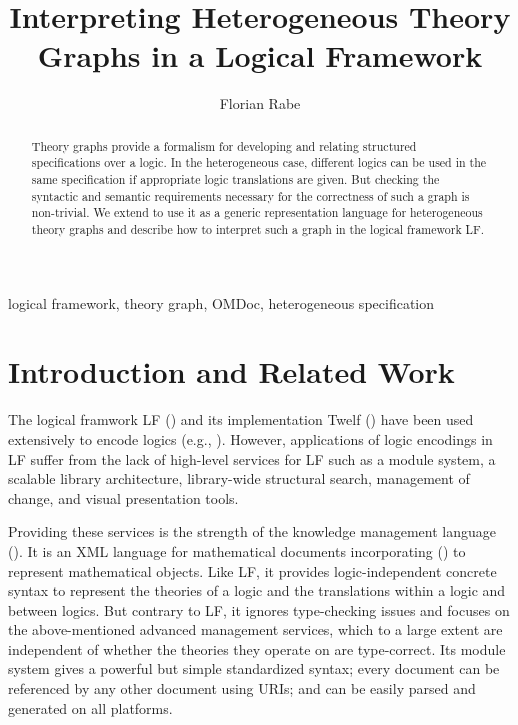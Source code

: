 \documentclass{entcs}
\begin{document}
\begin{frontmatter}
  \title{Interpreting Heterogeneous Theory Graphs in a Logical Framework}
  \author{Florian Rabe}
  \address{Jacobs University Bremen}

\begin{abstract} 
Theory graphs provide a formalism for developing and relating structured specifications over a logic. In the heterogeneous case, different logics can be used in the same specification if appropriate logic translations are given. But checking the syntactic and semantic requirements necessary for the correctness of such a graph is non-trivial. We extend {\omdoc} to use it as a generic representation language for heterogeneous theory graphs and describe how to interpret such a graph in the logical framework LF.
\end{abstract}
\begin{keyword}
  logical framework, theory graph, OMDoc, heterogeneous specification
\end{keyword}
\end{frontmatter}

\pagestyle{plain}

\maketitle{}

\lstset{mathescape,basicstyle=\footnotesize}

\section{Introduction and Related Work}

The logical framwork LF (\cite{lf}) and its implementation Twelf (\cite{twelf}) have been used extensively to encode logics (e.g., \cite{lfencodings,lfcut,logosphere}). However, applications of logic encodings in LF suffer from the lack of high-level services for LF such as a module system, a scalable library architecture, library-wide structural search, management of change, and visual presentation tools.

Providing these services is the strength of the knowledge management language {\omdoc} (\cite{omdoc}). It is an XML language for mathematical documents incorporating {\openmath} (\cite{openmath}) to represent mathematical objects. Like LF, it provides logic-independent concrete syntax to represent the theories of a logic and the translations within a logic and between logics. But contrary to LF, it ignores type-checking issues and focuses on the above-mentioned advanced management services, which to a large extent are independent of whether the theories they operate on are type-correct. Its module system gives a powerful but simple standardized syntax; every document can be referenced by any other document using URIs; and {\omdoc} can be easily parsed and generated on all platforms.
\end{document}
